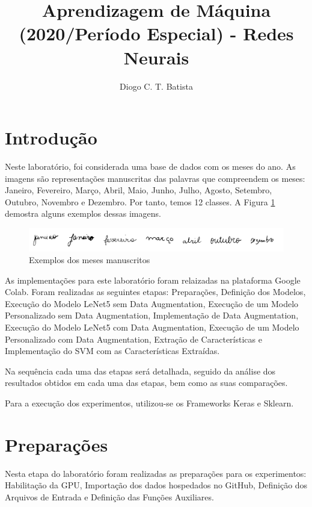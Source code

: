 \documentclass[12pt]{article}
\title{Aprendizagem de Máquina (2020/Período Especial) - Redes Neurais}
\author{Diogo C. T. Batista\inst{1}}
\begin{document}
\maketitle

\section{Introdução}

Neste laboratório, foi considerada uma base de dados com os meses do ano. As imagens são representações manuscritas das palavras que compreendem os meses: Janeiro, Fevereiro, Março, Abril, Maio, Junho, Julho, Agosto, Setembro, Outubro, Novembro e Dezembro. Por tanto, temos 12 classes. A Figura \ref{fig:image_months} demostra alguns exemplos dessas imagens.

\begin{figure}[!htb]
  \centering
  \includegraphics[width=35em]{images/image_months.png}
  \caption{Exemplos dos meses manuscritos}
  \label{fig:image_months}
\end{figure}

As implementações para este laboratório foram relaizadas na plataforma Google Colab. Foram realizadas as seguintes etapas: Preparações, Definição dos Modelos, Execução do Modelo LeNet5 sem Data Augmentation, Execução de um Modelo Personalizado sem Data Augmentation, Implementação de Data Augmentation, Execução do Modelo LeNet5 com Data Augmentation, Execução de um Modelo Personalizado com Data Augmentation, Extração de Características e Implementação do SVM com as Características Extraídas.

Na sequência cada uma das etapas será detalhada, seguido da análise dos resultados obtidos em cada uma das etapas, bem como as suas comparações.

Para a execução dos experimentos, utilizou-se os Frameworks Keras e Sklearn.

\section{Preparações}

Nesta etapa do laboratório foram realizadas as preparações para os experimentos: Habilitação da GPU, Importação dos dados hospedados no GitHub, Definição dos Arquivos de Entrada e Definição das Funções Auxiliares.
\end{document}
